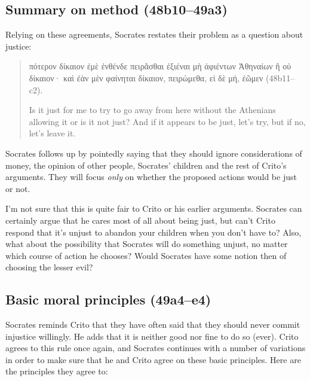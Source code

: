 \documentclass[11pt]{article}
\begin{document}

\subsection{Summary on method (48b10--49a3)}

Relying on these agreements, Socrates restates their problem as a question
about justice:

\begin{quote}

    {\g
    πότερον δίκαιον ἐμὲ ἐνθένδε πειρᾶσθαι ἐξιέναι μὴ ἀφιέντων Ἀθηναίων ἢ οὐ
    δίκαιον· καὶ ἐὰν μὲν φαίνηται δίκαιον, πειρώμεθα, εἰ δὲ μή, ἐῶμεν
    } (48b11--c2).

    Is it just for me to try to go away from here without the Athenians
    allowing it or is it not just? And if it appears to be just, let's try,
    but if no, let's leave it.

\end{quote}

Socrates follows up by pointedly saying that they should ignore
considerations of money, the opinion of other people, Socrates' children
and the rest of Crito's arguments.  They will focus \emph{only} on whether
the proposed actions would be just or not.

I'm not sure that this is quite fair to Crito or his earlier arguments.
Socrates can certainly argue that he cares most of all about being just,
but can't Crito respond that it's unjust to abandon your children when you
don't have to?  Also, what about the possibility that Socrates will do
something unjust, no matter which course of action he chooses?  Would
Socrates have some notion then of choosing the lesser evil?


\subsection{Basic moral principles (49a4--e4)}

Socrates reminds Crito that they have often said that they should never
commit injustice willingly.  He adds that it is neither good nor fine to do
so (ever).  Crito agrees to this rule once again, and Socrates continues
with a number of variations in order to make sure that he and Crito agree
on these basic principles.  Here are the principles they agree to:
\end{document}
